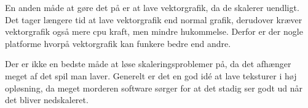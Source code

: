 \documentclass[Main.tex]{PositionOgSkalering}
\begin{document}
En anden måde at gøre det på er at lave vektorgrafik, da de skalerer uendligt. Det tager længere tid at lave vektorgrafik end normal grafik, derudover kræver vektorgrafik også mere cpu kraft, men mindre hukommelse\cite{deepworldgame}. Derfor er der nogle platforme hvorpå vektorgrafik kan funkere bedre end andre\cite{PassMark}.

Der er ikke en bedste måde at løse skaleringsproblemer på, da det afhænger meget af det spil man laver. Generelt er det en god idé at lave teksturer i høj opløsning, da meget morderen software sørger for at det stadig ser godt ud når det bliver nedskaleret.
\end{document}
